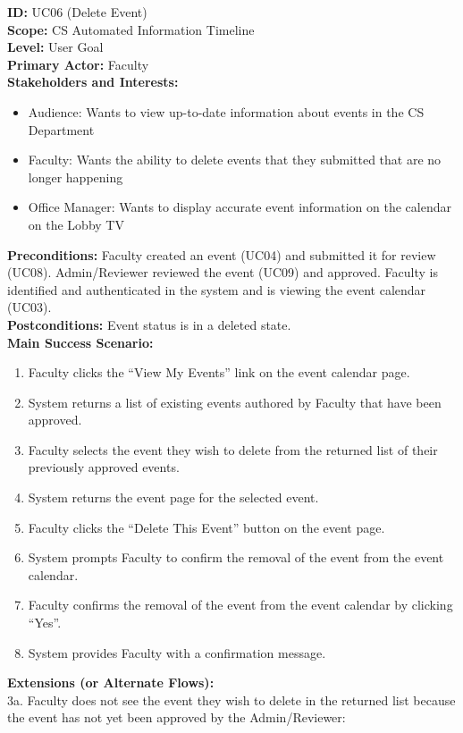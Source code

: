 \textbf{ID:} UC06 (Delete Event) \\
\textbf{Scope:} CS Automated Information Timeline \\
\textbf{Level:} User Goal \\
\textbf{Primary Actor:} Faculty \\
\textbf{Stakeholders and Interests:}
\begin{itemize}
    \item Audience: Wants to view up-to-date information about events in the CS Department
    \item Faculty: Wants the ability to delete events that they submitted that are no longer happening
    \item Office Manager: Wants to display accurate event information on the calendar on the Lobby TV
\end{itemize}
\textbf{Preconditions:} Faculty created an event (UC04) and submitted it for review (UC08). Admin/Reviewer reviewed the event (UC09) and approved. Faculty is identified and authenticated in the system and is viewing the event calendar (UC03). \\
\textbf{Postconditions:} Event status is in a deleted state. \\
\textbf{Main Success Scenario:}
\begin{enumerate}
    \item Faculty clicks the ``View My Events'' link on the event calendar page.
    \item System returns a list of existing events authored by Faculty that have been approved.
    \item Faculty selects the event they wish to delete from the returned list of their previously approved events.
    \item System returns the event page for the selected event.
    \item Faculty clicks the ``Delete This Event'' button on the event page.
    \item System prompts Faculty to confirm the removal of the event from the event calendar.
    \item Faculty confirms the removal of the event from the event calendar by clicking ``Yes''.
    \item System provides Faculty with a confirmation message.
\end{enumerate}
\textbf{Extensions (or Alternate Flows):} \\
3a. Faculty does not see the event they wish to delete in the returned list because the event has not yet been approved by the Admin/Reviewer:
